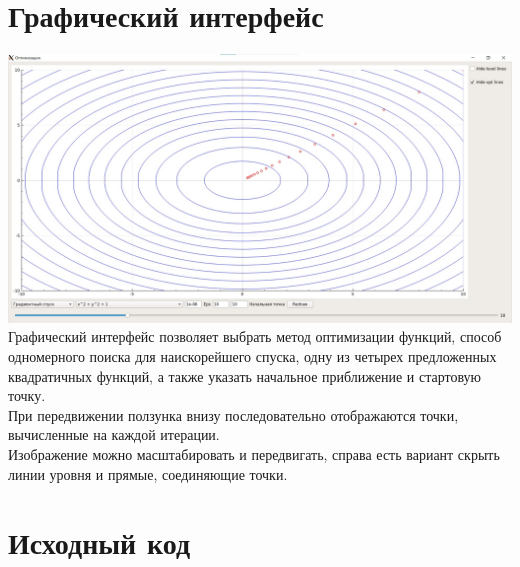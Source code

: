 	\newpage
	
	\section{Графический интерфейс}
	\includegraphics[scale=0.2]{img/gui.jpg}\\
	Графический интерфейс позволяет выбрать метод оптимизации функций, способ одномерного поиска для наискорейшего спуска, одну из четырех предложенных квадратичных функций, а также указать начальное приближение и стартовую точку.\\
	При передвижении ползунка внизу последовательно отображаются точки, вычисленные на каждой итерации.\\
	Изображение можно масштабировать и передвигать, справа есть вариант скрыть линии уровня и прямые, соединяющие точки.
	\newpage

	\section{Исходный код}
	
